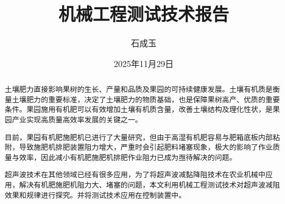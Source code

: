 \documentclass[12pt,fontset=windows]{ctexart}
\title{机械工程测试技术报告}
\author{石成玉}
\date{2025年11月29日}
\begin{document}
\maketitle

\begin{abstract}
	土壤肥力直接影响果树的生长、产量和品质及果园的可持续健康发展。土壤有机质是衡量土壤肥力的重要标准，决定了土壤肥力的物质基础，也是保障果树高产、优质的重要条件。果园施用有机肥可以有效增加土壤有机质含量，改善土壤结构及理化性状，是果园产业实现高质量高效率发展的关键之一。

	目前，果园有机肥施肥机已进行了大量研究，但由于高湿有机肥容易与肥箱底板内部粘附，导致施肥机排肥装置阻力增大，严重时会引起肥料堵塞现象，极大的影响了作业质量与效率，因此减小有机肥施肥机排肥作业阻力已成为亟待解决的问题。

	超声波技术在其他领域已经有很多应用，为了将超声波减黏降阻技术在农业机械中应用，解决有机肥施肥机阻力大、堵塞的问题，本文利用机械工程测试技术对超声波减阻效果和规律进行探究。并将测试技术应用在控制装置中。
\end{abstract}









\printbibliography
\end{document}
